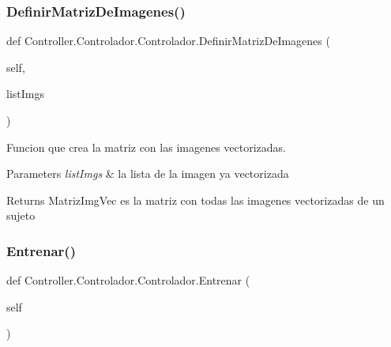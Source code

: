 \subsubsection{\texorpdfstring{Definir\+Matriz\+De\+Imagenes()}{DefinirMatrizDeImagenes()}}
{\footnotesize\ttfamily def Controller.\+Controlador.\+Controlador.\+Definir\+Matriz\+De\+Imagenes (\begin{DoxyParamCaption}\item[{}]{self,  }\item[{}]{list\+Imgs }\end{DoxyParamCaption})}



Funcion que crea la matriz con las imagenes vectorizadas. 


\begin{DoxyParams}{Parameters}
{\em list\+Imgs} & la lista de la imagen ya vectorizada \\
\hline
\end{DoxyParams}
\begin{DoxyReturn}{Returns}
Matriz\+Img\+Vec es la matriz con todas las imagenes vectorizadas de un sujeto 
\end{DoxyReturn}
\mbox{\label{class_controller_1_1_controlador_1_1_controlador_a56a3aa79738967e327fe35a017f72c24}} 
\subsubsection{\texorpdfstring{Entrenar()}{Entrenar()}}
{\footnotesize\ttfamily def Controller.\+Controlador.\+Controlador.\+Entrenar (\begin{DoxyParamCaption}\item[{}]{self }\end{DoxyParamCaption})}

\mbox{\label{class_controller_1_1_controlador_1_1_controlador_a4bbeb1232cf73c6c9113e7ffda714b63}} 
